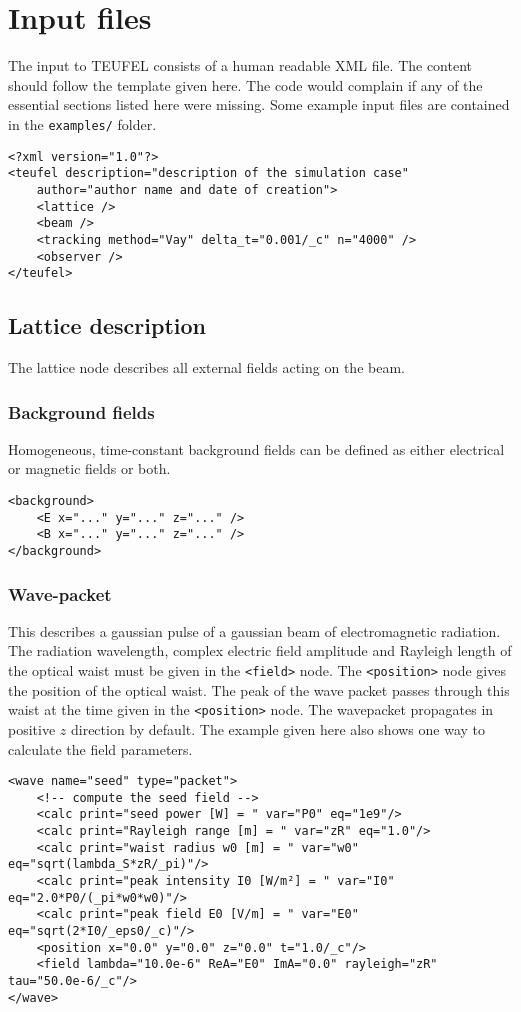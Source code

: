 \documentclass[11pt]{article}
\begin{document}
\section{Input files}

The input to TEUFEL consists of a human readable XML file. The content should follow
the template given here. The code would complain if any of the essential sections
listed here were missing. Some example input files are contained in the \verb|examples/| folder.

\begin{lstlisting}
<?xml version="1.0"?>
<teufel description="description of the simulation case"
    author="author name and date of creation">
    <lattice />
    <beam />
    <tracking method="Vay" delta_t="0.001/_c" n="4000" />
    <observer />
</teufel>
\end{lstlisting}

\subsection{Lattice description}

The lattice node describes all external fields acting on the beam.

\subsubsection{Background fields}
Homogeneous, time-constant background fields can be defined as either electrical or magnetic
fields or both.
\begin{lstlisting}
<background>
    <E x="..." y="..." z="..." />
    <B x="..." y="..." z="..." />
</background>
\end{lstlisting}


\subsubsection{Wave-packet}
This describes a gaussian pulse of a gaussian beam of electromagnetic radiation.
The radiation wavelength, complex electric field amplitude and Rayleigh length of
the optical waist must be given in the \verb|<field>| node. The \verb|<position>| node
gives the position of the optical waist. The peak of the wave packet passes through this waist
at the time given in the \verb|<position>| node. The wavepacket propagates
in positive $z$ direction by default. The example given here also shows
one way to calculate the field parameters.
\begin{lstlisting}
<wave name="seed" type="packet">
	<!-- compute the seed field -->
	<calc print="seed power [W] = " var="P0" eq="1e9"/>
	<calc print="Rayleigh range [m] = " var="zR" eq="1.0"/>
	<calc print="waist radius w0 [m] = " var="w0" eq="sqrt(lambda_S*zR/_pi)"/>
	<calc print="peak intensity I0 [W/m²] = " var="I0" eq="2.0*P0/(_pi*w0*w0)"/>
	<calc print="peak field E0 [V/m] = " var="E0" eq="sqrt(2*I0/_eps0/_c)"/>
	<position x="0.0" y="0.0" z="0.0" t="1.0/_c"/>
	<field lambda="10.0e-6" ReA="E0" ImA="0.0" rayleigh="zR" tau="50.0e-6/_c"/>
</wave>
\end{lstlisting}
\end{document}
